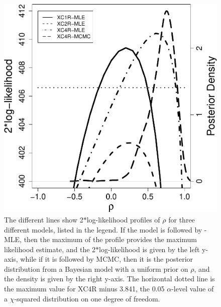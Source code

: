 \documentclass[11pt, titlepage]{article}\usepackage[]{graphicx}\usepackage[]{color}
\begin{document}
\begin{spacing}{1.9}
\begin{flushleft}
\begin{figure}[H]
  \begin{center}
  \includegraphics[width=.9\linewidth]{figure/Fig-rhoProfile-crop.pdf}
  \end{center}
  \caption{The different lines show 2$*$log-likelihood profiles of $\rho$ for three different models, listed in the legend.  If the model is followed by -MLE, then the maximum of the profile provides the maximum likelihood estimate, and the 2$*$log-likelihood is given by the left y-axis, while if it is followed by MCMC, then it is the posterior distribution from a Bayesian model with a uniform prior on $\rho$, and the density is given by the right y-axis.  The horizontal dotted line is the maximum value for XC4R minus 3.841, the 0.05 $\alpha$-level value of a $\chi$-squared distribution on one degree of freedom. \label{Fig-rhoProfile}}     
\end{figure}




\end{flushleft}
\end{spacing}
\end{document}

